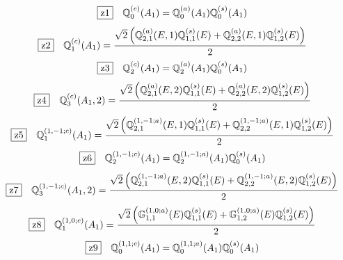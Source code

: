 \documentclass[fleqn,10pt,landscape]{jsarticle}
\begin{document}
\begin{dmath*}
\hspace*{3mm}\fbox{z1}\quad \mathbb{Q}_{0}^{(c)}(A_{1})=\mathbb{Q}_{0}^{(a)}(A_{1}) \mathbb{Q}_{0}^{(s)}(A_{1})
\end{dmath*}
\begin{dmath*}
\hspace*{3mm}\fbox{z2}\quad \mathbb{Q}_{1}^{(c)}(A_{1})=\frac{\sqrt{2} \left(\mathbb{Q}_{2,1}^{(a)}(E,1) \mathbb{Q}_{1,1}^{(s)}(E) + \mathbb{Q}_{2,2}^{(a)}(E,1) \mathbb{Q}_{1,2}^{(s)}(E)\right)}{2}
\end{dmath*}
\begin{dmath*}
\hspace*{3mm}\fbox{z3}\quad \mathbb{Q}_{2}^{(c)}(A_{1})=\mathbb{Q}_{2}^{(a)}(A_{1}) \mathbb{Q}_{0}^{(s)}(A_{1})
\end{dmath*}
\begin{dmath*}
\hspace*{3mm}\fbox{z4}\quad \mathbb{Q}_{3}^{(c)}(A_{1},2)=\frac{\sqrt{2} \left(\mathbb{Q}_{2,1}^{(a)}(E,2) \mathbb{Q}_{1,1}^{(s)}(E) + \mathbb{Q}_{2,2}^{(a)}(E,2) \mathbb{Q}_{1,2}^{(s)}(E)\right)}{2}
\end{dmath*}
\begin{dmath*}
\hspace*{3mm}\fbox{z5}\quad \mathbb{Q}_{1}^{(1,-1;c)}(A_{1})=\frac{\sqrt{2} \left(\mathbb{Q}_{2,1}^{(1,-1;a)}(E,1) \mathbb{Q}_{1,1}^{(s)}(E) + \mathbb{Q}_{2,2}^{(1,-1;a)}(E,1) \mathbb{Q}_{1,2}^{(s)}(E)\right)}{2}
\end{dmath*}
\begin{dmath*}
\hspace*{3mm}\fbox{z6}\quad \mathbb{Q}_{2}^{(1,-1;c)}(A_{1})=\mathbb{Q}_{2}^{(1,-1;a)}(A_{1}) \mathbb{Q}_{0}^{(s)}(A_{1})
\end{dmath*}
\begin{dmath*}
\hspace*{3mm}\fbox{z7}\quad \mathbb{Q}_{3}^{(1,-1;c)}(A_{1},2)=\frac{\sqrt{2} \left(\mathbb{Q}_{2,1}^{(1,-1;a)}(E,2) \mathbb{Q}_{1,1}^{(s)}(E) + \mathbb{Q}_{2,2}^{(1,-1;a)}(E,2) \mathbb{Q}_{1,2}^{(s)}(E)\right)}{2}
\end{dmath*}
\begin{dmath*}
\hspace*{3mm}\fbox{z8}\quad \mathbb{Q}_{1}^{(1,0;c)}(A_{1})=\frac{\sqrt{2} \left(\mathbb{G}_{1,1}^{(1,0;a)}(E) \mathbb{Q}_{1,1}^{(s)}(E) + \mathbb{G}_{1,2}^{(1,0;a)}(E) \mathbb{Q}_{1,2}^{(s)}(E)\right)}{2}
\end{dmath*}
\begin{dmath*}
\hspace*{3mm}\fbox{z9}\quad \mathbb{Q}_{0}^{(1,1;c)}(A_{1})=\mathbb{Q}_{0}^{(1,1;a)}(A_{1}) \mathbb{Q}_{0}^{(s)}(A_{1})
\end{dmath*}
\end{document}
